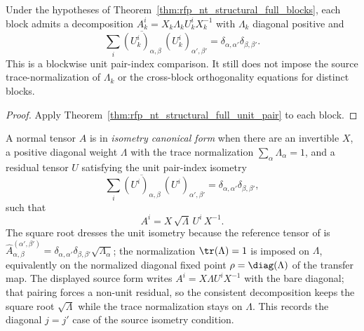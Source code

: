 \begin{theorem}%
    \label{thm:rfp_nt_structural_full_blocks_unit_pair}
    \leanok
    Under the hypotheses of
    Theorem~\ref{thm:rfp_nt_structural_full_blocks}, each block admits a
    decomposition $A_k^i = X_k \Lambda_k U_k^i X_k^{-1}$ with
    $\Lambda_k$ diagonal positive and
    \[
        \sum_i \overline{(U_k^i)_{\alpha,\beta}}\,
        (U_k^i)_{\alpha',\beta'}
        =
        \delta_{\alpha,\alpha'}\delta_{\beta,\beta'} .
    \]
    This is a blockwise unit pair-index comparison. It still does not impose
    the source trace-normalization of $\Lambda_k$ or the cross-block
    orthogonality equations for distinct blocks.
\end{theorem}
\begin{proof}\leanok
    Apply Theorem~\ref{thm:rfp_nt_structural_full_unit_pair} to each block.
\end{proof}

\begin{definition}%
    \label{def:is_isometry_canonical_form}
    \leanok
    A normal tensor $A$ is in \emph{isometry canonical form} when there are an
    invertible $X$, a positive diagonal weight $\Lambda$ with the trace
    normalization $\sum_\alpha \Lambda_\alpha = 1$, and a residual tensor $U$
    satisfying the unit pair-index isometry
    \[
        \sum_i \overline{(U^i)_{\alpha,\beta}}\,(U^i)_{\alpha',\beta'}
        = \delta_{\alpha,\alpha'}\delta_{\beta,\beta'},
    \]
    such that
    \[
        A^i = X\,\sqrt\Lambda\,U^i\,X^{-1}.
    \]
    The square root dresses the unit isometry because the reference tensor of
    \cite[Section~3]{Cirac2016MPDO_arXiv} is
    $\widehat A^{(\alpha',\beta')}_{\alpha,\beta}
        = \delta_{\alpha,\alpha'}\delta_{\beta,\beta'}\sqrt{\Lambda_\alpha}$;
    the normalization $\tr(\Lambda)=1$ is imposed on $\Lambda$, equivalently on
    the normalized diagonal fixed point $\rho=\diag(\Lambda)$ of the transfer
    map. The displayed source form writes $A^i=X\Lambda U^iX^{-1}$ with the bare
    diagonal; that pairing forces a non-unit residual, so the consistent
    decomposition keeps the square root $\sqrt\Lambda$ while the trace
    normalization stays on $\Lambda$. This records the diagonal $j=j'$ case of
    the source isometry condition.
\end{definition}

